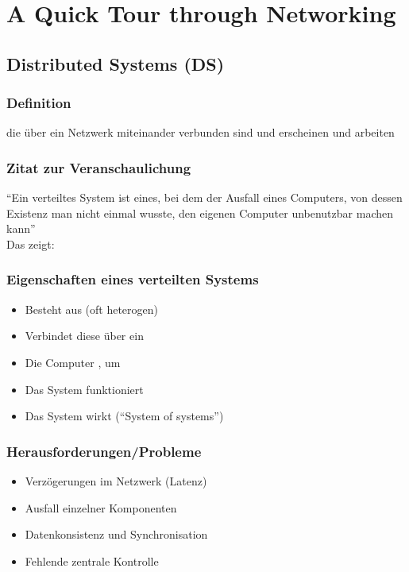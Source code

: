 \section{A Quick Tour through Networking}
\subsection{Distributed Systems (DS)}
\subsubsection*{Definition}
 die über ein Netzwerk miteinander verbunden sind und  erscheinen und arbeiten
\subsubsection*{Zitat zur Veranschaulichung}
 \enquote{Ein verteiltes System ist eines, bei dem der Ausfall eines Computers, von dessen Existenz man nicht einmal wusste, den eigenen Computer unbenutzbar machen kann}\\
Das zeigt: 
\subsubsection*{Eigenschaften eines verteilten Systems}
\begin{itemize}
    \item Besteht aus  (oft heterogen)
    \item Verbindet diese über ein 
    \item Die Computer , um 
    \item Das System funktioniert 
    \item Das System wirkt  (\enquote{System of systems})
\end{itemize}
\subsubsection*{Herausforderungen/Probleme}
\begin{itemize}
    \item Verzögerungen im Netzwerk (Latenz)
    \item Ausfall einzelner Komponenten
    \item Datenkonsistenz und Synchronisation
    \item Fehlende zentrale Kontrolle
\end{itemize}
